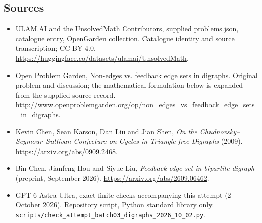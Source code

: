 \documentclass[11pt,a4paper]{article}
\begin{document}
\subsection{Sources}
\begin{itemize}
\item[S1] ULAM.AI and the UnsolvedMath Contributors, supplied problems.json, catalogue entry, OpenGarden collection. Catalogue identity and source transcription; CC BY 4.0.
\url{https://huggingface.co/datasets/ulamai/UnsolvedMath}.
\item[S2] Open Problem Garden, Non-edges vs. feedback edge sets in digraphs. Original problem and discussion; the mathematical formulation below is expanded from the supplied source record.
\url{http://www.openproblemgarden.org/op/non_edges_vs_feedback_edge_sets_in_digraphs}.
\item[S3] Kevin Chen, Sean Karson, Dan Liu and Jian Shen, \emph{On the Chudnovsky--Seymour--Sullivan Conjecture on Cycles in Triangle-free Digraphs} (2009). \url{https://arxiv.org/abs/0909.2468}.
\item[S4] Bin Chen, Jianfeng Hou and Siyue Liu, \emph{Feedback edge set in bipartite digraph} (preprint, September 2026). \url{https://arxiv.org/abs/2609.06462}.
\item[S9] GPT-6 Astra Ultra, exact finite checks accompanying this attempt (2 October 2026). Repository script, Python standard library only. \texttt{scripts/check\_attempt\_batch03\_digraphs\_2026\_10\_02.py}.
\end{itemize}
\end{document}
